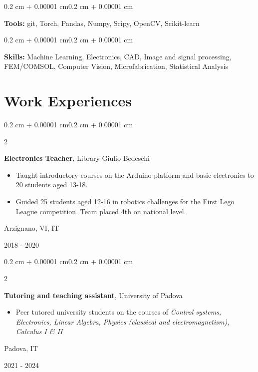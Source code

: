 \documentclass[10pt, letterpaper]{article}
\newenvironment{highlights}{
    \begin{itemize}[
        topsep=0.10 cm,
        parsep=0.10 cm,
        partopsep=0pt,
        itemsep=0pt,
        leftmargin=0.4 cm + 10pt
    ]
}{
    \end{itemize}
}
\newenvironment{onecolentry}{
    \begin{adjustwidth}{0.2 cm + 0.00001 cm}{0.2 cm + 0.00001 cm}
}{
    \end{adjustwidth}
}
\newenvironment{twocolentry}[2][]{
    \onecolentry
    \def\secondColumn{#2}
    \setcolumnwidth{\fill, 4.5 cm}
    \begin{paracol}{2}
}{
    \switchcolumn \raggedleft \secondColumn
    \end{paracol}
    \endonecolentry
}
\begin{document}
    \begin{onecolentry}
      \textbf{Tools:} git, Torch, Pandas, Numpy, Scipy, OpenCV, Scikit-learn
    \end{onecolentry} 
    \vspace{0.1 cm}    


    \begin{onecolentry}
      \textbf{Skills:} Machine Learning, Electronics, CAD, Image and signal processing, FEM/COMSOL, Computer Vision, Microfabrication, Statistical Analysis
    \end{onecolentry} 



    \section{Work Experiences}

    \begin{twocolentry}{
        Arzignano, VI, IT

2018 - 2020
    }
        \textbf{Electronics Teacher}, Library Giulio Bedeschi
        \begin{highlights}
            \item Taught introductory courses on the Arduino platform and basic electronics to 20 students aged 13-18.
            \item Guided 25 students aged 12-16 in robotics challenges for the First Lego League competition. Team placed 4th on national level.
          \end{highlights}
    \end{twocolentry}

    \vspace{0.2 cm}    
    \begin{twocolentry}{
        Padova, IT

2021 - 2024
    }
        \textbf{Tutoring and teaching assistant},  University of Padova
        \begin{highlights}
            \item Peer tutored university students on the courses of \textit{Control systems, Electronics, Linear Algebra, Physics (classical and electromagnetism), Calculus I \& II}
          \end{highlights}
    \end{twocolentry}
    \vspace{0.2 cm}
\end{document}
